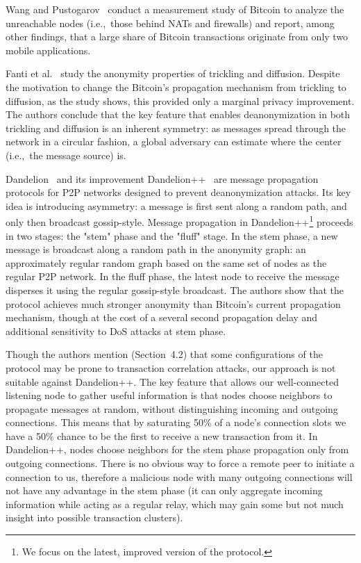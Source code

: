 Wang and Pustogarov~\cite{Wang2017} conduct a measurement study of Bitcoin to analyze the unreachable nodes (i.e.,~those behind NATs and firewalls) and report, among other findings, that a large share of Bitcoin transactions originate from only two mobile applications.

Fanti et al.~\cite{Fanti2017} study the anonymity properties of trickling and diffusion.
Despite the motivation to change the Bitcoin's propagation mechanism from trickling to diffusion, as the study shows, this provided only a marginal privacy improvement.
The authors conclude that the key feature that enables deanonymization in both trickling and diffusion is an inherent symmetry: as messages spread through the network in a circular fashion, a global adversary can estimate where the center (i.e.,~the message source) is.

Dandelion~\cite{Venkatakrishnan2017} and its improvement Dandelion++~\cite{Fanti2018} are message propagation protocols for P2P networks designed to prevent deanonymization attacks.
Its key idea is introducing asymmetry: a message is first sent along a random path, and only then broadcast gossip-style.
Message propagation in Dandelion++\footnote{We focus on the latest, improved version of the protocol.} proceeds in two stages: the "stem" phase and the "fluff" stage.
In the stem phase, a new message is broadcast along a random path in the anonymity graph: an approximately regular random graph based on the same set of nodes as the regular P2P network.
In the fluff phase, the latest node to receive the message disperses it using the regular gossip-style broadcast.
The authors show that the protocol achieves much stronger anonymity than Bitcoin's current propagation mechanism, though at the cost of a several second propagation delay and additional sensitivity to DoS attacks at stem phase. 

Though the authors mention (Section~4.2) that some configurations of the protocol may be prone to transaction  correlation attacks, our approach is not suitable against Dandelion++.
The key feature that allows our well-connected listening node to gather useful information is that nodes choose neighbors to propagate messages at random, without distinguishing incoming and outgoing connections.
This means that by saturating 50\% of a node's connection slots we have a 50\% chance to be the first to receive a new transaction from it.
In Dandelion++, nodes choose neighbors for the stem phase propagation only from outgoing connections.
There is no obvious way to force a remote peer to initiate a connection to us, therefore a malicious node with many outgoing connections will not have any advantage in the stem phase (it can only aggregate incoming information while acting as a regular relay, which may gain some but not much insight into possible transaction clusters).

